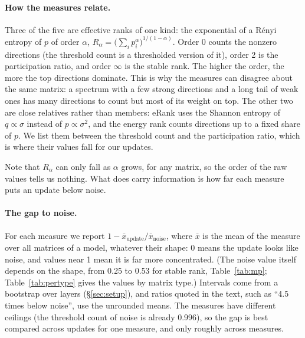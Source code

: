 \paragraph{How the measures relate.} Three of the five are effective ranks of
one kind: the exponential of a R\'enyi entropy of $p$ of order $\alpha$,
$R_\alpha = \bigl(\sum_i p_i^\alpha\bigr)^{1/(1-\alpha)}$. Order 0 counts the
nonzero directions (the threshold count is a thresholded version of it),
order 2 is the participation ratio, and order $\infty$ is the stable rank.
The higher the order, the more the top directions dominate. This is why the
measures can disagree about the same matrix: a spectrum with a few strong
directions and a long tail of weak ones has many directions to count but most
of its weight on top. The other two are close relatives rather than members:
eRank uses the Shannon entropy of $q \propto \sigma$ instead of
$p \propto \sigma^2$, and the energy rank counts directions up to a fixed share
of $p$. We list them between the threshold count and the participation ratio,
which is where their values fall for our updates.

Note that $R_\alpha$ can only fall as $\alpha$ grows, for any matrix, so the
order of the raw values tells us nothing. What does carry information is how
far each measure puts an update below noise.

\paragraph{The gap to noise.} For each measure we report
$1 - \bar{x}_{\text{update}}/\bar{x}_{\text{noise}}$, where $\bar{x}$ is the
mean of the measure over all matrices of a model, whatever their shape: 0
means the update looks like noise, and values near 1 mean it is far more
concentrated. (The noise value itself depends on the shape, from 0.25 to 0.53
for stable rank, Table~\ref{tab:mp}; Table~\ref{tab:pertype} gives the values
by matrix type.) Intervals come from a bootstrap over layers
(\S\ref{sec:setup}), and ratios quoted in the text, such as ``4.5 times below
noise'', use the unrounded means. The measures have different ceilings (the threshold count of
noise is already 0.996), so the gap is best compared across updates for one
measure, and only roughly across measures.

